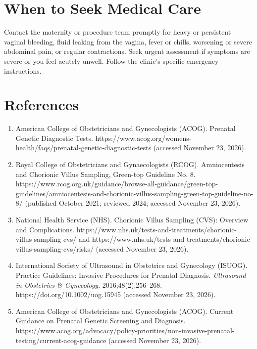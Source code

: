 \section*{When to Seek Medical Care}
Contact the maternity or procedure team promptly for heavy or persistent vaginal bleeding, fluid leaking from the vagina, fever or chills, worsening or severe abdominal pain, or regular contractions. Seek urgent assessment if symptoms are severe or you feel acutely unwell. Follow the clinic's specific emergency instructions.

\section*{References}
\begin{enumerate}
  \item American College of Obstetricians and Gynecologists (ACOG). Prenatal Genetic Diagnostic Tests. https://www.acog.org/womens-health/faqs/prenatal-genetic-diagnostic-tests (accessed November 23, 2026).
  \item Royal College of Obstetricians and Gynaecologists (RCOG). Amniocentesis and Chorionic Villus Sampling, Green-top Guideline No. 8. https://www.rcog.org.uk/guidance/browse-all-guidance/green-top-guidelines/amniocentesis-and-chorionic-villus-sampling-green-top-guideline-no-8/ (published October 2021; reviewed 2024; accessed November 23, 2026).
  \item National Health Service (NHS). Chorionic Villus Sampling (CVS): Overview and Complications. https://www.nhs.uk/tests-and-treatments/chorionic-villus-sampling-cvs/ and https://www.nhs.uk/tests-and-treatments/chorionic-villus-sampling-cvs/risks/ (accessed November 23, 2026).
  \item International Society of Ultrasound in Obstetrics and Gynecology (ISUOG). Practice Guidelines: Invasive Procedures for Prenatal Diagnosis. \textit{Ultrasound in Obstetrics \& Gynecology}. 2016;48(2):256--268. https://doi.org/10.1002/uog.15945 (accessed November 23, 2026).
  \item American College of Obstetricians and Gynecologists (ACOG). Current Guidance on Prenatal Genetic Screening and Diagnosis. https://www.acog.org/advocacy/policy-priorities/non-invasive-prenatal-testing/current-acog-guidance (accessed November 23, 2026).
\end{enumerate}

\clearpage
